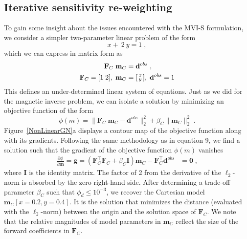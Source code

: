 \documentclass[paper]{geophysics}
\begin{document}
\subsection{Iterative sensitivity re-weighting}
To gain some insight about the issues encountered with the MVI-S formulation, we consider a simpler two-parameter linear problem of the form
\begin{equation}
x + \:2\:y =1 \;,
\end{equation}
which we can express in matrix form as
\begin{equation}\label{twoParam}
\begin{split}
\mathbf{F}_C\;\mathbf{m}_C &= \mathbf{d}^{obs} \;,\\
\mathbf{F}_C = [1\;2], \;
\mathbf{m}_C &=
\begin{bsmallmatrix}
x\\
y
\end{bsmallmatrix}, \;
\mathbf{d}^{obs} = 1
\end{split}
\end{equation}
This defines an under-determined linear system of equations. Just as we did for the magnetic inverse problem, we can isolate a solution by minimizing an objective function of the form
\begin{equation}\label{toyProblem}
\phi(m) = \| \mathbf{F}_C\;\mathbf{m}_C - \mathbf{d}^{obs} \|_2^2 + \beta_C \| \mathbf{m}_C \|_2^2 \;.
\end{equation}
Figure~\ref{NonLinearGN}a displays a contour map of the objective function along with its gradients.
Following the same methodology as in equation 9, we find a solution such that the gradient of the objective function $\phi(m)$ vanishes
\begin{equation}\label{gradLinear}
\begin{split}
\frac{\partial \phi}{\partial \mathbf{m}}=\mathbf{g} = \left(\mathbf{F}_C^\top\mathbf{F}_C + \beta_C \mathbf{I}\right) \mathbf{m}_C - \mathbf{F}_C^\top \mathbf{d}^{obs} &= \mathbf{0}\;,
\end{split}
\end{equation}
where $\mathbf{I}$ is the identity matrix. The factor of 2 from the derivative of the $\ell_2$-norm is absorbed by the zero right-hand side.
After determining a trade-off parameter $\beta_C$ such that $\phi_d \leq 10^{-3}$, we recover the Cartesian model $\mathbf{m}_C[x=0.2, y=0.4]$. It is the solution that minimizes the distance (evaluated with the $\ell_2$-norm) between the origin and the solution space of $\mathbf{F}_C$. We note that the relative magnitudes of model parameters in $\mathbf{m}_C$ reflect the size of the forward coefficients in $\mathbf{F}_C$.
\end{document}
